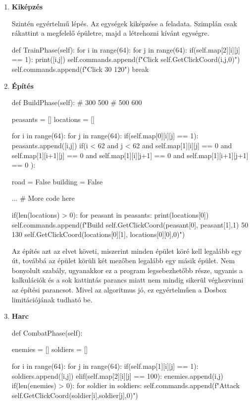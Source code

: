 \begin{enumerate}
    \item \textbf{Kiképzés}
    
Szintén egyértelmű lépés. Az egységek kiképzése a feladata. Szimplán csak rákattint a megfelelő épületre, majd a létrehozni kívánt egységre.
    \begin{python}
def TrainPhase(self):
    for i in range(64):
        for j in range(64):
            if(self.map[2][i][j] == 1):
                print([i,j])
                self.commands.append(f"Click 
                        {self.GetClickCoord(i,j,0)}")
                self.commands.append(f"Click 30 120")
                break
    \end{python}

    \item \textbf{Építés}
    
    \begin{python}
def BuildPhase(self):
# 300 500
# 500 600

peasants = []
locations = []

for i in range(64):
    for j in range(64):
        if(self.map[0][i][j] == 1):
            peasants.append([i,j])
        if(i < 62 and j < 62 and self.map[1][i][j] == 0 and 
        self.map[1][i+1][j] == 0 and 
        self.map[1][i][j+1] == 0 and 
        self.map[1][i+1][j+1] == 0 ):
                    
            road = False
            building = False

            ... # More code here
           
if(len(locations) > 0):
    for peasant in peasants:
            print(locations[0])
            self.commands.append(f"Build 
            {self.GetClickCoord(peasant[0],
            peasant[1],1)} 50 130 
            {self.GetClickCoord(locations[0][1],
            locations[0][0],0)}")

    \end{python}

    Az építés azt az elvet követi, miszerint minden épület köré kell legalább egy út, továbbá az épület körüli két mezőben legalább egy másik épület. Nem bonyolult szabály, ugyanakkor ez a program legsebezhetőbb része, ugyanis a kalkulációk és a sok kattintás parancs miatt nem mindig sikerül véghezvinni az építési parancsot. Mivel az algoritmus jó, ez egyértelműen a Dosbox limitációjának tudható be.

    \item \textbf{Harc}
    
    \begin{python}
def CombatPhase(self):

    enemies = []
    soldiers = []

    for i in range(64):
        for j in range(64):
            if(self.map[1][i][j] == 1):
                soldiers.append([i,j])
            elif(self.map[2][i][j] == 100):
                enemies.append(i,j)
    if(len(enemies) > 0):
        for soldier in soldiers:
            self.commands.append(f"Attack 
                    {self.GetClickCoord(soldier[i],soldier[j],0)}")

    \end{python}

\end{enumerate}


